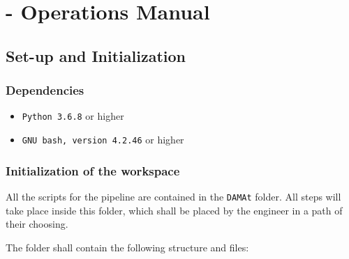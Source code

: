 
\chapter{\DAMA - Operations Manual}

\section{Set-up and Initialization}
\label{sec:dama_setup}
\subsection{Dependencies}

\begin{itemize}
	\item \texttt{Python 3.6.8} or higher
	\item \texttt{GNU bash, version 4.2.46} or higher
\end{itemize}

\subsection{Initialization of the \DAMA workspace}

All the scripts for the \DAMA pipeline are contained in the \texttt{DAMAt} folder.
All \DAMA steps will take place inside this folder, which shall be placed by the engineer in a path of their choosing.

The folder shall contain the following structure and files:

